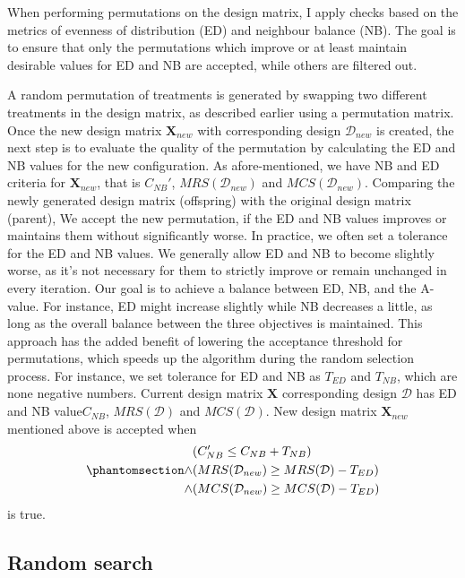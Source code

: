 \documentclass[
  a4paper,
  oneside,
  openany,
  12pt,
  onecolumn]{book}
\theoremstyle{plain}
\theoremstyle{definition}
\theoremstyle{remark}
\begin{document}
When performing permutations on the design matrix, I apply checks based
on the metrics of evenness of distribution (ED) and neighbour balance
(NB). The goal is to ensure that only the permutations which improve or
at least maintain desirable values for ED and NB are accepted, while
others are filtered out.

A random permutation of treatments is generated by swapping two
different treatments in the design matrix, as described earlier using a
permutation matrix. Once the new design matrix \(\boldsymbol{X}_{new}\)
with corresponding design \(\mathcal{D}_{new}\) is created, the next
step is to evaluate the quality of the permutation by calculating the ED
and NB values for the new configuration. As afore-mentioned, we have NB
and ED criteria for \(\boldsymbol{X}_{new}\), that is \(C_{NB}'\),
\(MRS(\mathcal{D}_{new})\) and \(MCS(\mathcal{D}_{new})\). Comparing the
newly generated design matrix (offspring) with the original design
matrix (parent), We accept the new permutation, if the ED and NB values
improves or maintains them without significantly worse. In practice, we
often set a tolerance for the ED and NB values. We generally allow ED
and NB to become slightly worse, as it's not necessary for them to
strictly improve or remain unchanged in every iteration. Our goal is to
achieve a balance between ED, NB, and the A-value. For instance, ED
might increase slightly while NB decreases a little, as long as the
overall balance between the three objectives is maintained. This
approach has the added benefit of lowering the acceptance threshold for
permutations, which speeds up the algorithm during the random selection
process. For instance, we set tolerance for ED and NB as \(T_{ED}\) and
\(T_{NB}\), which are none negative numbers. Current design matrix
\(\boldsymbol{X}\) corresponding design \(\mathcal{D}\) has ED and NB
value\(C_{NB}\), \(MRS(\mathcal{D})\) and \(MCS(\mathcal{D})\). New
design matrix \(\boldsymbol{X}_{new}\) mentioned above is accepted when
\begin{equation}\phantomsection\label{eq-accp}{
\begin{align*}
&(C_{NB}'\leq C_{NB}+T_{NB}) \\
\land & (MRS(\mathcal{D}_{new})\geq MRS(\mathcal{D})-T_{ED})\\
\land & (MCS(\mathcal{D}_{new})\geq MCS(\mathcal{D})-T_{ED})
\end{align*}
}\end{equation} is true.

\subsection{Random search}\label{random-search}
\end{document}
